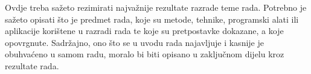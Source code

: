 \documentclass{foi}
\begin{document}
Ovdje treba sažeto rezimirati najvažnije rezultate razrade teme rada. Potrebno je sažeto opisati što je predmet rada, koje su metode, tehnike, programski alati ili aplikacije korištene u razradi rada te koje su pretpostavke dokazane, a koje opovrgnute. Sadržajno, ono što se u uvodu rada najavljuje i kasnije je obuhvaćeno u samom radu, moralo bi biti opisano u zaključnom dijelu kroz rezultate rada.

\printbibliography[title=Popis literature]

\listoffigures
{}

\lstlistoflistings
{}
\end{document}

